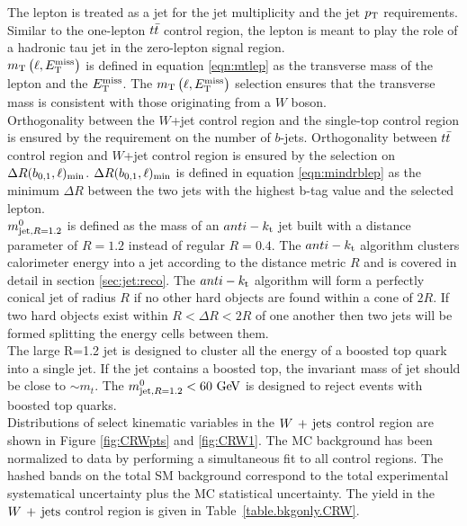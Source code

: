 \indent The lepton is treated as a jet for the jet multiplicity and the jet $p_{\mathrm{T}}$ requirements.  Similar to the one-lepton $t\bar{t}$ control region, the lepton is meant to play the role of a hadronic tau jet in the zero-lepton signal region.  \\

\indent $m_{\mathrm{T}}\left(\ell,E_{\mathrm{T}}^{\mathrm{miss}}\right)$ is defined in equation \ref{eqn:mtlep} as the transverse mass of the lepton and the $E_{\mathrm{T}}^{\mathrm{miss}}$.  The $m_{\mathrm{T}}\left(\ell,E_{\mathrm{T}}^{\mathrm{miss}}\right)$ selection ensures that the transverse mass is consistent with those originating from a $W$ boson.  \\

\indent Orthogonality between the $W$+jet control region and the single-top control region is ensured by the requirement on the number of $b$-jets.  Orthogonality between $t\bar{t}$ control region and $W$+jet control region is ensured by the selection on $\Delta R(b_{0,1},\ell)_{\mathrm{min}}$.  $\Delta R(b_{0,1},\ell)_{\mathrm{min}}$ is defined in equation \ref{eqn:mindrblep} as the minimum $\Delta R$ between the two jets with the highest b-tag value and the selected lepton. \\

\indent $m^{0}_{\mathrm{jet,}R=1.2}$ is defined as the mass of an $anti-k_{\rm{t}}$ jet built with a distance parameter of $R=1.2$ instead of regular $R=0.4$.  The $anti-k_{\rm{t}}$ algorithm clusters calorimeter energy into a jet according to the distance metric $R$ and is covered in detail in section \ref{sec:jet:reco}.  The $anti-k_{\rm{t}}$ algorithm will form a perfectly conical jet of radius $R$ if no other hard objects are found within a cone of $2R$.  If two hard objects exist within $R<\Delta R<2R$ of one another then two jets will be formed splitting the energy cells between them.  \\

\indent The large R=1.2 jet is designed to cluster all the energy of a boosted top quark into a single jet.  If the jet contains a boosted top, the invariant mass of jet should be close to $\sim m_t$. The $\mantikttwelvezero < 60 \gev$ is designed to reject events with boosted top quarks.  \\

\indent  Distributions of select kinematic variables in the $W\,+\,\mathrm{jets}$ control region are shown in Figure \ref{fig:CRWpts} and \ref{fig:CRW1}.  The MC background has been normalized to data by performing a simultaneous fit to all control regions.  The hashed bands on the total SM background correspond to the total experimental systematical uncertainty plus the MC statistical uncertainty.  The yield in the $W\,+\,\mathrm{jets}$ control region is given in Table~\ref{table.bkgonly.CRW}.  \\

